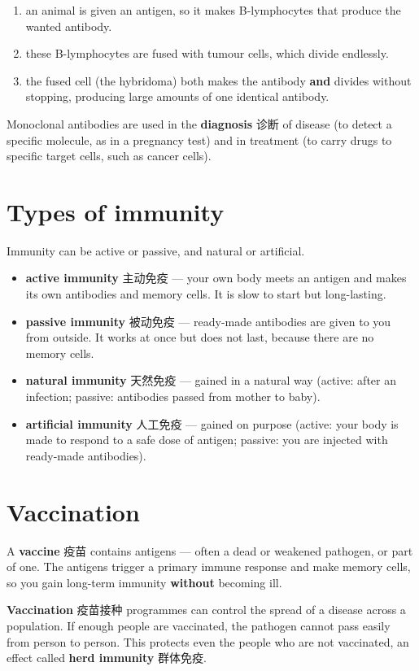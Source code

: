 \documentclass[11pt]{article}
\begin{document}
\begin{enumerate}
\item an animal is given an antigen, so it makes B-lymphocytes that produce the wanted antibody.

\item these B-lymphocytes are fused with tumour cells, which divide endlessly.

\item the fused cell (the hybridoma) both makes the antibody \textbf{and} divides without stopping, producing large amounts of one identical antibody.

\end{enumerate}

Monoclonal antibodies are used in the \textbf{diagnosis} 诊断 of disease (to detect a specific molecule, as in a pregnancy test) and in treatment (to carry drugs to specific target cells, such as cancer cells).

\section*{Types of immunity}

Immunity can be active or passive, and natural or artificial.

\begin{itemize}
\item \textbf{active immunity} 主动免疫 — your own body meets an antigen and makes its own antibodies and memory cells. It is slow to start but long-lasting.

\item \textbf{passive immunity} 被动免疫 — ready-made antibodies are given to you from outside. It works at once but does not last, because there are no memory cells.

\item \textbf{natural immunity} 天然免疫 — gained in a natural way (active: after an infection; passive: antibodies passed from mother to baby).

\item \textbf{artificial immunity} 人工免疫 — gained on purpose (active: your body is made to respond to a safe dose of antigen; passive: you are injected with ready-made antibodies).

\end{itemize}

\section*{Vaccination}

A \textbf{vaccine} 疫苗 contains antigens — often a dead or weakened pathogen, or part of one. The antigens trigger a primary immune response and make memory cells, so you gain long-term immunity \textbf{without} becoming ill.

\textbf{Vaccination} 疫苗接种 programmes can control the spread of a disease across a population. If enough people are vaccinated, the pathogen cannot pass easily from person to person. This protects even the people who are not vaccinated, an effect called \textbf{herd immunity} 群体免疫.
\end{document}
